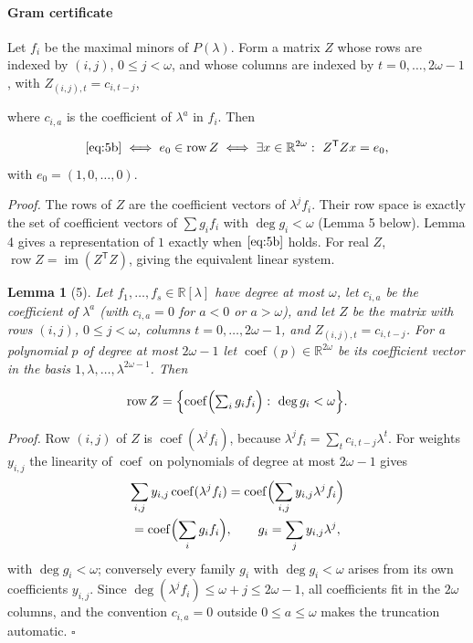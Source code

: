 \documentclass[journal]{IEEEtran}
\theoremstyle{plainn}
\newtheorem*{lem}{Lemma}
\begin{document}
\paragraph*{Gram certificate}\label{sec:gram}
Let $f_i$ be the maximal minors of $P(\lambda)$. Form a matrix $Z$ whose rows are indexed by $(i,j)$, $0\le j<\omega$, and whose columns are indexed by $t=0,\ldots,2\omega-1$, with $Z_{(i,j),t}=c_{i,t-j}$,

where $c_{i,a}$ is the coefficient of $\lambda^a$ in $f_i$. Then

\begin{equation}
\eqref{eq:5b}\iff e_0\in\operatorname{row}Z
\iff\exists x\in\mathbb R^{2\omega}:\ Z^{\mathsf T}Zx=e_0,
\end{equation}
with $e_0=(1,0,\ldots,0)$.

\emph{Proof.} The rows of $Z$ are the coefficient vectors of $\lambda^j f_i$. Their row space is exactly the set of coefficient vectors of $\sum g_i f_i$ with $\deg g_i<\omega$ (Lemma 5 below). Lemma 4 gives a representation of $1$ exactly when $\eqref{eq:5b}$ holds. For real $Z$, $\operatorname{row}Z=\operatorname{im}(Z^{\mathsf T}Z)$, giving the equivalent linear system.

\begin{lem}[5] Let $f_1,\dots,f_s\in\mathbb R[\lambda]$ have degree at most $\omega$, let $c_{i,a}$ be the
coefficient of $\lambda^a$ (with $c_{i,a}=0$ for $a<0$ or $a>\omega$), and let $Z$ be the matrix
with rows $(i,j)$, $0\le j<\omega$, columns $t=0,\dots,2\omega-1$, and $Z_{(i,j),t}=c_{i,t-j}$.
For a polynomial $p$ of degree at most $2\omega-1$ let $\operatorname{coef}(p)\in\mathbb R^{2\omega}$
be its coefficient vector in the basis $1,\lambda,\dots,\lambda^{2\omega-1}$. Then

\begin{equation}
\operatorname{row}Z=\Bigl\{\operatorname{coef}\Bigl(\textstyle\sum_i g_if_i\Bigr)
:\ \deg g_i<\omega\Bigr\}.
\end{equation}
\end{lem}
\emph{Proof.} Row $(i,j)$ of $Z$ is $\operatorname{coef}(\lambda^jf_i)$, because
$\lambda^jf_i=\sum_tc_{i,t-j}\lambda^t$. For weights $y_{i,j}$ the linearity of $\operatorname{coef}$ on
polynomials of degree at most $2\omega-1$ gives
\begin{equation}
\begin{gathered}
\sum_{i,j}y_{i,j}\operatorname{coef}(\lambda^jf_i)
=\operatorname{coef}\Bigl(\sum_{i,j}y_{i,j}\lambda^jf_i\Bigr)\\
=\operatorname{coef}\Bigl(\sum_ig_if_i\Bigr),
\qquad g_i=\sum_jy_{i,j}\lambda^j ,
\end{gathered}
\end{equation}
with $\deg g_i<\omega$; conversely every family $g_i$ with $\deg g_i<\omega$ arises from its own
coefficients $y_{i,j}$. Since $\deg(\lambda^jf_i)\le\omega+j\le2\omega-1$, all coefficients fit in the
$2\omega$ columns, and the convention $c_{i,a}=0$ outside $0\le a\le\omega$ makes the truncation
automatic. $\square$
\end{document}
